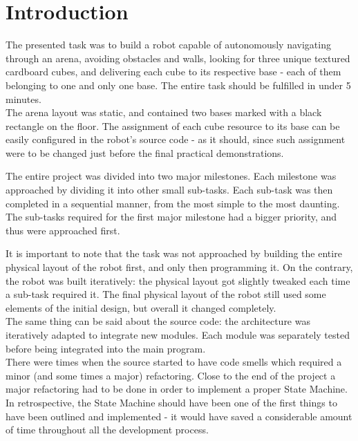 \section{Introduction}

The presented task was to build a robot capable of autonomously navigating through an arena, avoiding obstacles and walls, looking for three unique textured cardboard cubes, and delivering each cube to its respective base - each of them belonging to one and only one base. The entire task should be fulfilled in under 5 minutes.\\
The arena layout was static, and contained two bases marked with a black rectangle on the floor. The assignment of each cube resource to its base can be easily configured in the robot's source code - as it should, since such assignment were to be changed just before the final practical demonstrations.

The entire project was divided into two major milestones. Each milestone was approached by dividing it into other small sub-tasks. Each sub-task was then completed in a sequential manner, from the most simple to the most daunting.\\
The sub-tasks required for the first major milestone had a bigger priority, and thus were approached first.

It is important to note that the task was not approached by building the entire physical layout of the robot first, and only then programming it. On the contrary, the robot was built iteratively: the physical layout got slightly tweaked each time a sub-task required it. The final physical layout of the robot still used some elements of the initial design, but overall it changed completely.\\
The same thing can be said about the source code: the architecture was iteratively adapted to integrate new modules. Each module was separately tested before being integrated into the main program.\\
There were times when the source started to have code smells which required a minor (and some times a major) refactoring. Close to the end of the project a major refactoring had to be done in order to implement a proper State Machine. In retrospective, the State Machine should have been one of the first things to have been outlined and implemented - it would have saved a considerable amount of time throughout all the development process.

\newpage
